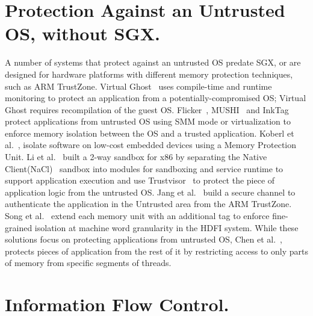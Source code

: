 \section{Protection Against an Untrusted OS, without SGX.}

A number of systems that protect against an untrusted OS predate SGX, or are designed for hardware platforms with different memory protection techniques, such as ARM TrustZone.
Virtual Ghost~\citep{criswell2014virtual} uses compile-time and runtime monitoring to protect an application
from a potentially-compromised OS; Virtual Ghost requires recompilation of the guest OS.
Flicker~\citep{flicker}, MUSHI~\citep{zhang2012mushi} and InkTag~\citep{inktag} protect applications from untrusted OS using SMM mode or virtualization
to enforce memory isolation between the OS and a trusted application.
Koberl et al.~\citep{koeberl2014trustlite}, isolate software on low-cost embedded devices using a Memory Protection Unit.
Li et al.~\citep{li2014minibox} built a 2-way sandbox for x86 by separating the Native Client(NaCl)~\citep{yee2009native} sandbox into modules for sandboxing and service runtime to support application execution and use Trustvisor~\citep{trustvisor} to protect the piece of application logic from the untrusted OS.
Jang et al.~\citep{jang2015secret} build a secure channel to authenticate the application in the Untrusted area from the ARM TrustZone.
Song et al.~\citep{songhdfi} extend each memory unit with an additional tag
to enforce fine-grained isolation at machine word granularity in the HDFI system.
While these solutions focus on protecting applications from untrusted OS, Chen et  al.~\citep{chenshreds}, protects pieces of application from the rest of it by restricting access to only parts of memory from specific segments of threads.



\section{Information Flow Control.}

